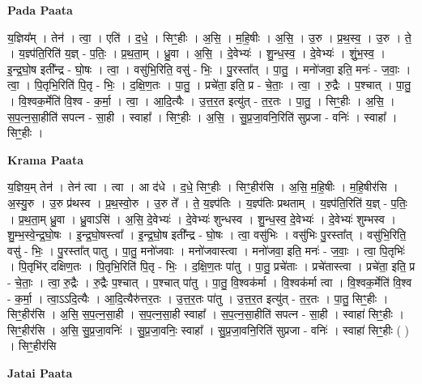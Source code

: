 \documentclass[17pt]{extarticle}
\begin{document}
\textbf{Pada Paata} \newline

य॒ज्ञिय᳚म् । तेन॑ । त्वा॒ । एति॑ । द॒धे॒ । सिꣳ॒॒हीः । अ॒सि॒ । म॒हि॒षीः । अ॒सि॒ । उ॒रु । प्र॒थ॒स्व॒ । उ॒रु । ते॒ । य॒ज्ञ्प॑ति॒रिति॑ य॒ज्ञ् - प॒तिः॒ । प्र॒थ॒ता॒म् । ध्रु॒वा । अ॒सि॒ । दे॒वेभ्यः॑ । शु॒न्ध॒स्व॒ । दे॒वेभ्यः॑ । शुं॒भ॒स्व॒ । इ॒न्द्र॒घो॒ष इती᳚न्द्र - घो॒षः । त्वा॒ । वसु॑भि॒रिति॒ वसु॑ - भिः॒ । पु॒रस्ता᳚त् । पा॒तु॒ । मनो॑जवा॒ इति॒ मनः॑ - ज॒वाः॒ । त्वा॒ । पि॒तृभि॒रिति॑ पि॒तृ - भिः॒ । द॒क्षि॒ण॒तः । पा॒तु॒ । प्रचे॑ता॒ इति॒ प्र - चे॒ताः॒ । त्वा॒ । रु॒द्रैः । प॒श्चात् । पा॒तु॒ । वि॒श्वक॒र्मेति॑ वि॒श्व - क॒र्मा॒ । त्वा॒ । आ॒दि॒त्यैः । उ॒त्त॒र॒त इत्यु॑त् - त॒र॒तः । पा॒तु॒ । सिꣳ॒॒हीः । अ॒सि॒ । स॒प॒त्न॒सा॒हीति॑ सपत्न - सा॒ही । स्वाहा᳚ । सिꣳ॒॒हीः । अ॒सि॒ । सु॒प्र॒जा॒वनि॒रिति॑ सुप्रजा - वनिः॑ । स्वाहा᳚ । सिꣳ॒॒हीः ।  \newline


\textbf{Krama Paata} \newline

य॒ज्ञिय॒म् तेन॑ । तेन॑ त्वा । त्वा । आ द॑धे । द॒धे॒ सिꣳ॒॒हीः । सिꣳ॒॒हीर॑सि । अ॒सि॒ म॒हि॒षीः । म॒हि॒षीर॑सि । अ॒स्यु॒रु । उ॒रु प्र॑थस्व । प्र॒थ॒स्वो॒रु । उ॒रु ते᳚ । ते॒ य॒ज्ञ्प॑तिः । य॒ज्ञ्प॑तिः प्रथताम् । य॒ज्ञ्प॑ति॒रिति॑ य॒ज्ञ् - प॒तिः॒ । प्र॒थ॒ता॒म् ध्रु॒वा । ध्रु॒वाऽसि॑ । अ॒सि॒ दे॒वेभ्यः॑ । दे॒वेभ्यः॑ शुन्धस्व । शु॒न्ध॒स्व॒ दे॒वेभ्यः॑ । दे॒वेभ्यः॑ शुम्भस्व । शु॒म्भ॒स्वे॒न्द्र॒घो॒षः । इ॒न्द्र॒घो॒षस्त्वा᳚ । इ॒न्द्र॒घो॒ष इती᳚न्द्र - घो॒षः । त्वा॒ वसु॑भिः । वसु॑भिः पु॒रस्ता᳚त् । वसु॑भि॒रिति॒ वसु॑ - भिः॒ । पु॒रस्ता᳚त् पातु । पा॒तु॒ मनो॑जवाः । मनो॑जवास्त्वा । मनो॑जवा॒ इति॒ मनः॑ - ज॒वाः॒ । त्वा॒ पि॒तृभिः॑ । पि॒तृभि॑र् दक्षिण॒तः । पि॒तृभि॒रिति॑ पि॒तृ - भिः॒ । द॒क्षि॒ण॒तः पा॑तु । पा॒तु॒ प्रचे॑ताः । प्रचे॑तास्त्वा । प्रचे॑ता॒ इति॒ प्र - चे॒ताः॒ । त्वा॒ रु॒द्रैः । रु॒द्रैः प॒श्चात् । प॒श्चात् पा॑तु । पा॒तु॒ वि॒श्वक॑र्मा । वि॒श्वक॑र्मा त्वा । वि॒श्वक॒र्मेति॑ वि॒श्व - क॒र्मा॒ । त्वा॒ऽऽदि॒त्यैः । आ॒दि॒त्यैरु॑त्तर॒तः । उ॒त्त॒र॒तः पा॑तु । उ॒त्त॒र॒त इत्यु॑त् - त॒र॒तः । पा॒तु॒ सिꣳ॒॒हीः । सिꣳ॒॒हीर॑सि । अ॒सि॒ स॒प॒त्न॒सा॒ही । स॒प॒त्न॒सा॒ही स्वाहा᳚ । स॒प॒त्न॒सा॒हीति॑ सपत्न - सा॒ही । स्वाहा॑ सिꣳ॒॒हीः । सिꣳ॒॒हीर॑सि । अ॒सि॒ सु॒प्र॒जा॒वनिः॑ । सु॒प्र॒जा॒वनिः॒ स्वाहा᳚ । सु॒प्र॒जा॒वनि॒रिति॑ सुप्रजा - वनिः॑ । स्वाहा॑ सिꣳ॒॒हीः ( ) । सिꣳ॒॒हीर॑सि \newline

\textbf{Jatai Paata} \newline
\end{document}
